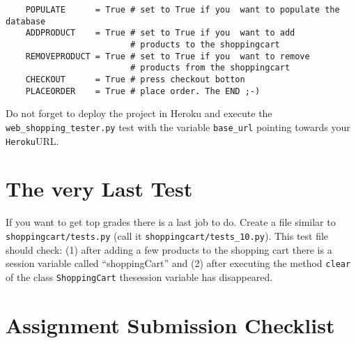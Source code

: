 \documentclass[12pt]{article} %
\newcommand{\ttt}[1]{\texttt{#1}}%
\newcommand{\heroku}{\texttt{Heroku}}
\begin{document}
\begin{verbatim}
    POPULATE      = True # set to True if you  want to populate the database
    ADDPRODUCT    = True # set to True if you  want to add
                         # products to the shoppingcart
    REMOVEPRODUCT = True # set to True if you  want to remove
                         # products from the shoppingcart
    CHECKOUT      = True # press checkout botton
    PLACEORDER    = True # place order. The END ;-)
\end{verbatim}

Do not forget to deploy the project in Heroku and execute the \ttt{web\_shopping\_tester.py}
test with the variable \ttt{base\_url} pointing towards your \heroku URL.

\section{The very Last Test}
If you want to get top grades there is a last job to do. Create a file similar to  \ttt{shoppingcart/tests.py} (call it \ttt{shoppingcart/tests\_10.py}). This test file should check: (1)  after adding a few products to the shopping cart there is a session variable called ``shoppingCart'' and (2) after executing the method \ttt{clear} of the class \ttt{ShoppingCart} thesession variable has disappeared.


\section{Assignment Submission Checklist} %
\end{document}
